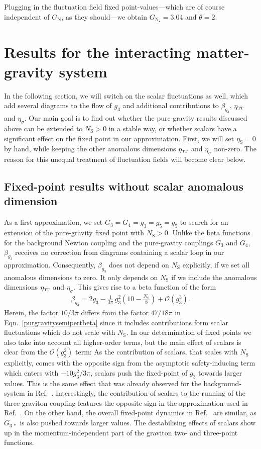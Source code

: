 \documentclass[11pt]{book} %
\newcommand\TTspace{ -1pt }
\newcommand\etaTT{ \eta_{\scriptscriptstyle{\mathrm{T\hspace{\TTspace}T}}} }
\newcommand\etaS{ \eta_{\scriptscriptstyle{\mathrm{S}}} }
\newcommand\NS{ N_{\scriptscriptstyle{\mathrm{S}}} }
\newcommand\GNewton{ G_{\scriptscriptstyle{\mathrm{N}}} }
\newcommand\Gback{ \GNewton } %
\numberwithin{equation}{chapter}
\begin{document}
Plugging in the fluctuation field fixed point-values---which are of course independent
of $\Gback$, as they should---we obtain $\Gback_{\star} = 3.04$ and $\theta=2$.


\section{Results for the interacting matter-gravity system}

In the following section, we will switch on the scalar fluctuations as well,
which add several diagrams to the flow of $g_3$ and additional contributions to
$\beta_{g_3}$, $\etaTT$ and $\eta_{\sigma}$.
Our main goal is to find out whether the pure-gravity results discussed above can be
extended to $\NS>0$ in a stable way,
or whether scalars have a significant effect on the fixed point in our approximation.
First, we will set $\etaS=0$ by hand, while keeping the other anomalous dimensions
$\etaTT$ and $\eta_{\sigma}$ non-zero.
The reason for this unequal treatment of fluctuation fields will become clear below.


\subsection{Fixed-point results without scalar anomalous dimension}

As a first approximation, we set $G_3=G_4=g_3=g_5=g_5$
to search for an extension of the pure-gravity fixed point with $\NS>0$.
Unlike the beta functions for the background Newton coupling and the pure-gravity
couplings $G_3$ and $G_4$, $\beta_{g_3}$ receives no correction from diagrams containing
a scalar loop  in our approximation.
Consequently, $\beta_{g_3}$ does not depend on $\NS$ explicitly, if we set all anomalous dimensions to zero.
It only depends on $\NS$ if we include the anomalous dimensions $\etaTT$ and $\eta_{\sigma}$.
This gives rise to a beta function of the form
\begin{align}
  \beta_{g_3} = 2 g_3 - \frac{1}{3\pi} \, g_3^2 \left( 10-\frac{\NS}{8} \right) + \mathcal{O}(g_3^3).
  \label{norma}
\end{align}
Herein, the factor $10/3\pi$ differs from the  factor $47/18\pi$ in
Eqn.~\eqref{purgravitysemipertbeta} since it includes contributions form scalar fluctuations
which do not scale with $\NS$.
In our determination of fixed points we also take into account all higher-order terms,
but the main effect of scalars is clear from the $\mathcal{O}(g_3^2)$ term:
As the contribution of scalars, that scales with $\NS$ explicitly,
comes with the opposite sign from the asymptotic safety-inducing term which enters with $-10g_3^2/3\pi$,
scalars push the fixed-point of $g_3$ towards larger values.
This is the same effect that was already observed for the background-system in Ref.~\cite{Dona:2013qba}.
Interestingly, the contribution of scalars to the running of the three-graviton coupling features
the opposite sign in the approximation used in Ref.~\cite{Meibohm:2015twa}.
On the other hand, the overall fixed-point dynamics in Ref.~\cite{Meibohm:2015twa} are similar,
as $G_{3\,\ast}$ is also pushed towards larger values.
The destabilising effects of scalars show up in the momentum-independent part of the
graviton two- and three-point functions.
\end{document}
